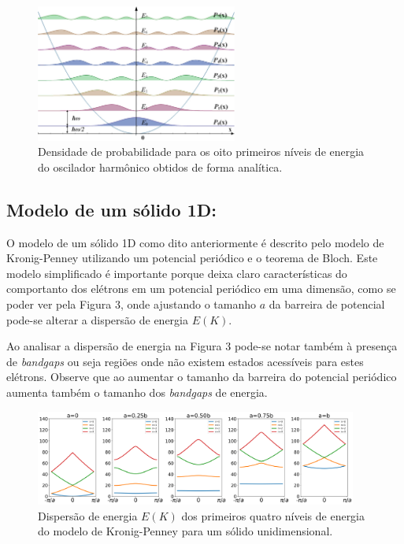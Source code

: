 \documentclass[11pt]{article}
\begin{document}
\begin{figure}[htbp]
\centering
\includegraphics[width=250]{./probability-density.png}
\caption{Densidade de probabilidade para os oito primeiros níveis de energia do oscilador harmônico obtidos de forma analítica.}
\end{figure}

\subsection{Modelo de um sólido 1D:}
\label{sec:org4627ec0}
O modelo de um sólido 1D como dito anteriormente é descrito pelo modelo de Kronig-Penney utilizando um potencial periódico e o teorema de Bloch. Este modelo simplificado é importante porque deixa claro características do comportanto dos elétrons em um potencial periódico em uma dimensão, como se poder ver pela Figura 3, onde ajustando o tamanho \(a\) da barreira de potencial pode-se alterar a dispersão de energia \(E(K)\).

Ao analisar a dispersão de energia na Figura 3 pode-se notar também à presença de \emph{bandgaps} ou seja regiões onde não existem estados acessíveis para estes elétrons. Observe que ao aumentar o tamanho da barreira do potencial periódico aumenta também o tamanho dos \emph{bandgaps} de energia.


\begin{figure}[htbp]
\centering
\includegraphics[width=400]{./bands.png}
\caption{Dispersão de energia \(E(K)\) dos primeiros quatro níveis de energia do modelo de Kronig-Penney para um sólido unidimensional.}
\end{figure}
\end{document}
